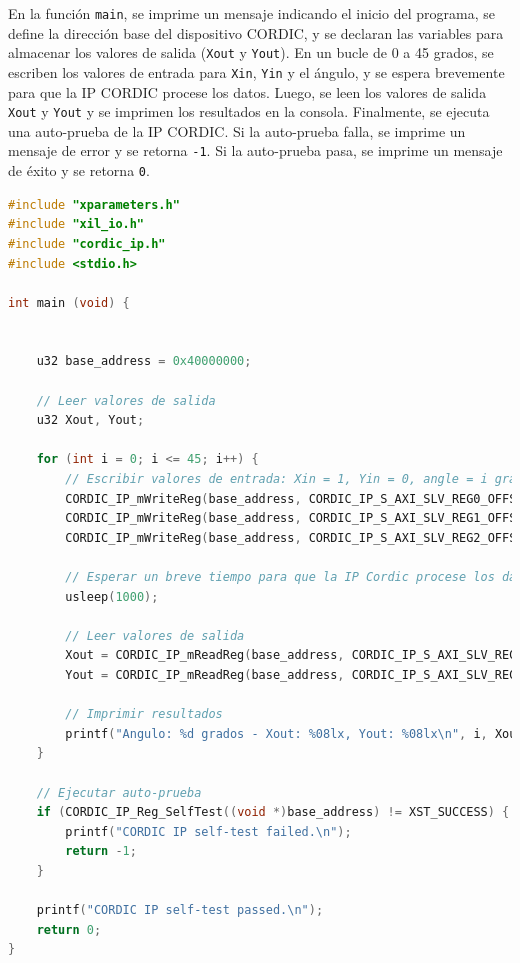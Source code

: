 \documentclass[12pt,a4paper, twoside]{article} %
\begin{document}
En la función \texttt{main}, se imprime un mensaje indicando el inicio del programa, se define la dirección base del dispositivo CORDIC, y se declaran las variables para almacenar los valores de salida (\texttt{Xout} y \texttt{Yout}). En un bucle de 0 a 45 grados, se escriben los valores de entrada para \texttt{Xin}, \texttt{Yin} y el ángulo, y se espera brevemente para que la IP CORDIC procese los datos. Luego, se leen los valores de salida \texttt{Xout} y \texttt{Yout} y se imprimen los resultados en la consola. Finalmente, se ejecuta una auto-prueba de la IP CORDIC. Si la auto-prueba falla, se imprime un mensaje de error y se retorna \texttt{-1}. Si la auto-prueba pasa, se imprime un mensaje de éxito y se retorna \texttt{0}.


\begin{lstlisting}[language=C, caption={Código para validar el uso de IP cores propios}, label={lst:cordic_validation}, basicstyle=\ttfamily\footnotesize, keywordstyle=\color{blue}]
#include "xparameters.h"
#include "xil_io.h"
#include "cordic_ip.h"
#include <stdio.h>

int main (void) {


    u32 base_address = 0x40000000; 

    // Leer valores de salida
    u32 Xout, Yout;

    for (int i = 0; i <= 45; i++) {
        // Escribir valores de entrada: Xin = 1, Yin = 0, angle = i grados
        CORDIC_IP_mWriteReg(base_address, CORDIC_IP_S_AXI_SLV_REG0_OFFSET, 1); 
        CORDIC_IP_mWriteReg(base_address, CORDIC_IP_S_AXI_SLV_REG1_OFFSET, 0);  
        CORDIC_IP_mWriteReg(base_address, CORDIC_IP_S_AXI_SLV_REG2_OFFSET, i << 30);

        // Esperar un breve tiempo para que la IP Cordic procese los datos
        usleep(1000);

        // Leer valores de salida
        Xout = CORDIC_IP_mReadReg(base_address, CORDIC_IP_S_AXI_SLV_REG3_OFFSET);  
        Yout = CORDIC_IP_mReadReg(base_address, CORDIC_IP_S_AXI_SLV_REG4_OFFSET);  

        // Imprimir resultados
        printf("Angulo: %d grados - Xout: %08lx, Yout: %08lx\n", i, Xout, Yout);
    }

    // Ejecutar auto-prueba
    if (CORDIC_IP_Reg_SelfTest((void *)base_address) != XST_SUCCESS) {
        printf("CORDIC IP self-test failed.\n");
        return -1;
    }

    printf("CORDIC IP self-test passed.\n");
    return 0;
}
\end{lstlisting}
\end{document}
